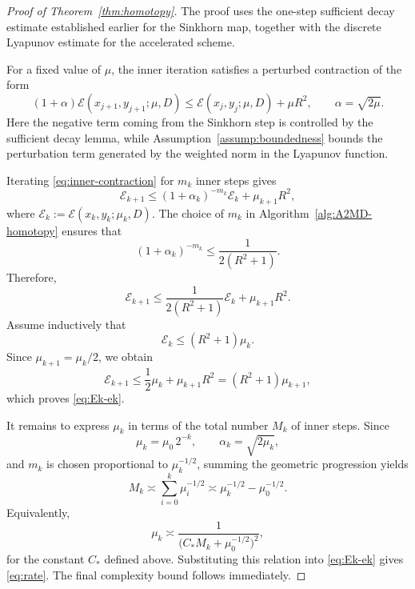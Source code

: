\documentclass{article}
\theoremstyle{plain}
\theoremstyle{remark}
\begin{document}
\begin{proof}[Proof of Theorem~\ref{thm:homotopy}]
The proof uses the one-step sufficient decay estimate established earlier for the Sinkhorn map, together with the discrete Lyapunov estimate for the accelerated scheme.

For a fixed value of $\mu$, the inner iteration satisfies a perturbed contraction of the form
\begin{equation}\label{eq:inner-contraction}
(1+\alpha)\mathcal E(x_{j+1},y_{j+1};\mu,D)\le \mathcal E(x_j,y_j;\mu,D)+\mu R^2,
\qquad \alpha=\sqrt{2\mu}.
\end{equation}
Here the negative term coming from the Sinkhorn step is controlled by the sufficient decay lemma, while Assumption~\ref{assump:boundedness} bounds the perturbation term generated by the weighted norm in the Lyapunov function.

Iterating \eqref{eq:inner-contraction} for $m_k$ inner steps gives
\begin{equation}\label{eq:mk-step}
\mathcal E_{k+1}\le (1+\alpha_k)^{-m_k}\mathcal E_k+\mu_{k+1}R^2,
\end{equation}
where $\mathcal E_k:=\mathcal E(x_k,y_k;\mu_k,D)$. The choice of $m_k$ in Algorithm~\ref{alg:A2MD-homotopy} ensures that
$$
(1+\alpha_k)^{-m_k}\le \frac{1}{2(R^2+1)}.
$$
Therefore,
$$
\mathcal E_{k+1}\le \frac{1}{2(R^2+1)}\mathcal E_k+\mu_{k+1}R^2.
$$
Assume inductively that
$$
\mathcal E_k\le (R^2+1)\mu_k.
$$
Since $\mu_{k+1}=\mu_k/2$, we obtain
$$
\mathcal E_{k+1}\le \frac{1}{2}\mu_k+\mu_{k+1}R^2=(R^2+1)\mu_{k+1},
$$
which proves \eqref{eq:Ek-ek}.

It remains to express $\mu_k$ in terms of the total number $M_k$ of inner steps. Since
$$
\mu_k=\mu_0\,2^{-k},
\qquad
\alpha_k=\sqrt{2\mu_k},
$$
and $m_k$ is chosen proportional to $\mu_k^{-1/2}$, summing the geometric progression yields
$$
M_k\asymp \sum_{i=0}^k \mu_i^{-1/2}
\asymp \mu_k^{-1/2}-\mu_0^{-1/2}.
$$
Equivalently,
$$
\mu_k\asymp \frac{1}{\bigl(C_*M_k+\mu_0^{-1/2}\bigr)^2},
$$
for the constant $C_*$ defined above. Substituting this relation into \eqref{eq:Ek-ek} gives \eqref{eq:rate}. The final complexity bound follows immediately.
\end{proof}





\end{document}
